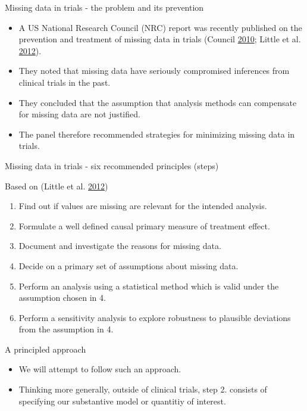 \documentclass[ignorenonframetext,]{beamer}
\providecommand{\tightlist}{%
  \setlength{\itemsep}{0pt}\setlength{\parskip}{0pt}}
\begin{document}
\begin{frame}{Missing data in trials - the problem and its prevention}
\protect\hypertarget{missing-data-in-trials---the-problem-and-its-prevention}{}

\begin{itemize}
\tightlist
\item
  A US National Research Council (NRC) report was recently published on
  the prevention and treatment of missing data in trials (Council
  \protect\hyperlink{ref-NRC2010}{2010}; Little et al.
  \protect\hyperlink{ref-Little2012}{2012}).
\item
  They noted that missing data have seriously compromised inferences
  from clinical trials in the past.
\item
  They concluded that the assumption that analysis methods can
  compensate for missing data are not justified.
\item
  The panel therefore recommended strategies for minimizing missing data
  in trials.
\end{itemize}

\end{frame}

\begin{frame}{Missing data in trials - six recommended principles
(steps)}
\protect\hypertarget{missing-data-in-trials---six-recommended-principles-steps}{}

Based on (Little et al. \protect\hyperlink{ref-Little2012}{2012})

\begin{enumerate}
\tightlist
\item
  Find out if values are missing are relevant for the intended analysis.
\item
  Formulate a well defined causal primary measure of treatment effect.
\item
  Document and investigate the reasons for missing data.
\item
  Decide on a primary set of assumptions about missing data.
\item
  Perform an analysis using a statistical method which is valid under
  the assumption chosen in 4.
\item
  Perform a sensitivity analysis to explore robustness to plausible
  deviations from the assumption in 4.
\end{enumerate}

\end{frame}

\begin{frame}{A principled approach}
\protect\hypertarget{a-principled-approach}{}

\begin{itemize}
\tightlist
\item
  We will attempt to follow such an approach.
\item
  Thinking more generally, outside of clinical trials, step 2. consists
  of specifying our substantive model or quantitiy of interest.
\end{itemize}

\end{frame}
\end{document}
